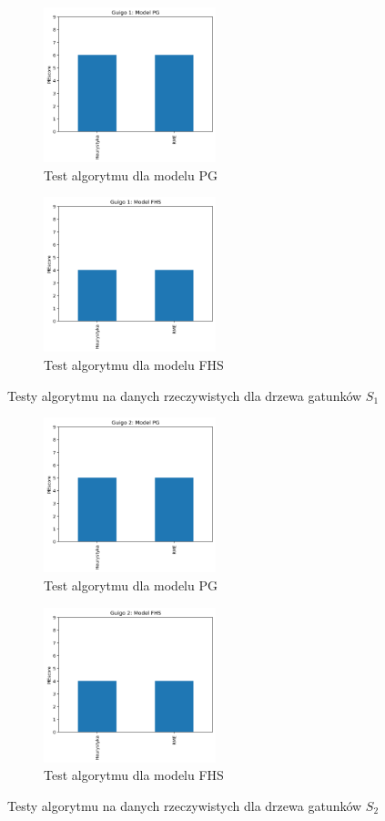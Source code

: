 \documentclass[licencjacka]{pracamgr}
\begin{document}
\begin{figure}[H]
\centering
\begin{subfigure}{.5\textwidth}
  \centering
  \includegraphics[width=50mm]{./pictures/G1_PG.png}
  \caption{Test algorytmu dla modelu PG}
\end{subfigure}%
\begin{subfigure}{.5\textwidth}
  \centering
  \includegraphics[width=50mm]{./pictures/G1_FHS.png}
  \caption{Test algorytmu dla modelu FHS}
\end{subfigure}%
\caption{Testy algorytmu na danych rzeczywistych dla drzewa gatunków $S_1$}
\end{figure}


\begin{figure}[H]
\centering
\begin{subfigure}{.5\textwidth}
  \centering
  \includegraphics[width=50mm]{./pictures/G2_PG.png}
  \caption{Test algorytmu dla modelu PG}
\end{subfigure}%
\begin{subfigure}{.5\textwidth}
  \centering
  \includegraphics[width=50mm]{./pictures/G2_FHS.png}
  \caption{Test algorytmu dla modelu FHS}
\end{subfigure}%
\caption{Testy algorytmu na danych rzeczywistych dla drzewa gatunków $S_2$}
\end{figure}
\end{document}
